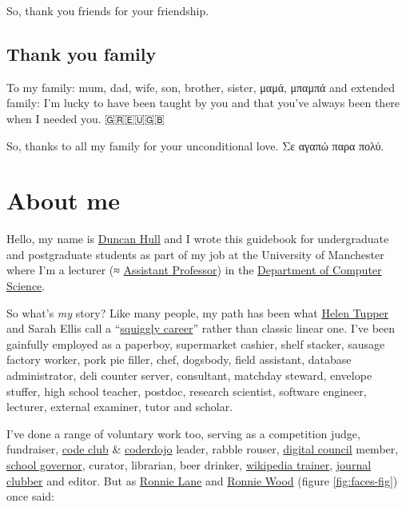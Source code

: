\documentclass[
]{book}
\begin{document}
So, thank you friends for your friendship. 🙏

\hypertarget{family}{%
\subsection{Thank you family}\label{family}}

To my family: mum, dad, wife, son, brother, sister, μαμά, μπαμπά and extended family: I'm lucky to have been taught by you and that you've always been there when I needed you. 🇬🇷🇪🇺🇬🇧

So, thanks to all my family for your unconditional love. Σε αγαπώ παρα πολύ. 🙏

\hypertarget{duncan}{%
\section{About me}\label{duncan}}

Hello, my name is \href{http://www.cs.man.ac.uk/~hulld/}{Duncan Hull} and I wrote this guidebook for undergraduate and postgraduate students as part of my job at the University of Manchester where I'm a lecturer (≈ \href{https://en.wikipedia.org/wiki/Assistant_professor}{Assistant Professor}) in the \href{https://www.cs.manchester.ac.uk/}{Department of Computer Science}.

So what's \emph{my} story? Like many people, my path has been what \href{https://twitter.com/HelenTupper}{Helen Tupper} and Sarah Ellis call a ``\href{https://www.amazingif.com/}{squiggly career}'' rather than classic linear one. \citep{squigglybook, squigglytalk} I've been gainfully employed as a paperboy, supermarket cashier, shelf stacker, sausage factory worker, pork pie filler, chef, dogsbody, field assistant, database administrator, deli counter server, consultant, matchday steward, envelope stuffer, high school teacher, postdoc, research scientist, software engineer, lecturer, external examiner, tutor and scholar.

I've done a range of voluntary work too, serving as a competition judge, fundraiser, \href{https://codeclub.org}{code club} \& \href{https://coderdojo.com}{coderdojo} leader, rabble rouser, \href{https://www.manchesterdigital.com/}{digital council} member, \href{https://governorsforschools.org.uk/}{school governor}, curator, librarian, beer drinker, \href{https://wiki-loves-scientists.org.uk/}{wikipedia trainer}, \href{https://sigcse.cs.manchester.ac.uk/}{journal clubber} and editor. But as \href{https://en.wikipedia.org/wiki/Ronnie_Lane}{Ronnie Lane} and \href{https://en.wikipedia.org/wiki/Ronnie_Wood}{Ronnie Wood} (figure \ref{fig:faces-fig}) once said:
\end{document}
